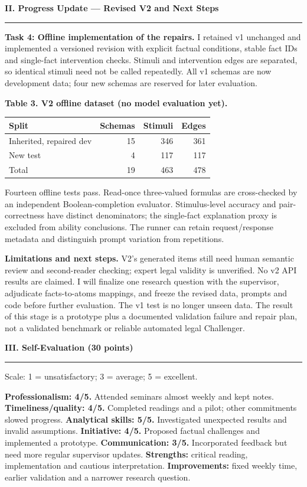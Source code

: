 \documentclass[12pt,a4paper]{article}
\newcommand{\heading}[1]{\textbf{#1}\par\nobreak\vspace{2pt}\hrule\vspace{4pt}}
\begin{document}
\begin{mdframed}[style=vinframe]
\heading{II. Progress Update --- Revised V2 and Next Steps}
\textbf{Task 4: Offline implementation of the repairs.} I retained v1 unchanged and implemented a versioned revision with explicit factual conditions, stable fact IDs and single-fact intervention checks. Stimuli and intervention edges are separated, so identical stimuli need not be called repeatedly. All v1 schemas are now development data; four new schemas are reserved for later evaluation.

\textbf{Table 3. V2 offline dataset (no model evaluation yet).}
\begin{center}
\setlength{\tabcolsep}{7pt}
\begin{tabular}{lrrr}
\toprule
Split & Schemas & Stimuli & Edges\\
\midrule
Inherited, repaired dev & 15 & 346 & 361\\
New test & 4 & 117 & 117\\
Total & 19 & 463 & 478\\
\bottomrule
\end{tabular}
\end{center}
Fourteen offline tests pass. Read-once three-valued formulas are cross-checked by an independent Boolean-completion evaluator. Stimulus-level accuracy and pair-correctness have distinct denominators; the single-fact explanation proxy is excluded from ability conclusions. The runner can retain request/response metadata and distinguish prompt variation from repetitions.

\textbf{Limitations and next steps.} V2's generated items still need human semantic review and second-reader checking; expert legal validity is unverified. No v2 API results are claimed. I will finalize one research question with the supervisor, adjudicate facts-to-atoms mappings, and freeze the revised data, prompts and code before further evaluation. The v1 test is no longer unseen data. The result of this stage is a prototype plus a documented validation failure and repair plan, not a validated benchmark or reliable automated legal Challenger.

\end{mdframed}
\newpage
\begin{mdframed}[style=vinframe]
\heading{III. Self-Evaluation (30 points)}
Scale: 1 = unsatisfactory; 3 = average; 5 = excellent.

\textbf{Professionalism: 4/5.} Attended seminars almost weekly and kept notes.
\textbf{Timeliness/quality: 4/5.} Completed readings and a pilot; other commitments slowed progress.
\textbf{Analytical skills: 5/5.} Investigated unexpected results and invalid assumptions.
\textbf{Initiative: 4/5.} Proposed factual challenges and implemented a prototype.
\textbf{Communication: 3/5.} Incorporated feedback but need more regular supervisor updates.
\textbf{Strengths:} critical reading, implementation and cautious interpretation.
\textbf{Improvements:} fixed weekly time, earlier validation and a narrower research question.
\end{mdframed}
\end{document}
